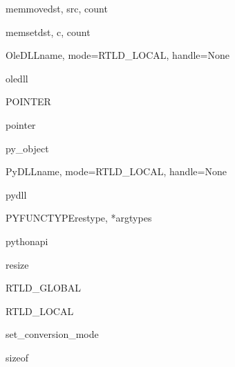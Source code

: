 \begin{funcdesc}{memmove}{dst, src, count}
\end{funcdesc}

\begin{funcdesc}{memset}{dst, c, count}
\end{funcdesc}

\begin{classdesc}{OleDLL}{name, mode=RTLD_LOCAL, handle=None}
\end{classdesc}

\begin{datadesc}{oledll}
\end{datadesc}

\begin{funcdesc}{POINTER}{}
\end{funcdesc}

\begin{funcdesc}{pointer}{}
\end{funcdesc}

\begin{classdesc}{py_object}{}
\end{classdesc}

\begin{classdesc}{PyDLL}{name, mode=RTLD_LOCAL, handle=None}
\end{classdesc}

\begin{datadesc}{pydll}{}
\end{datadesc}

\begin{funcdesc}{PYFUNCTYPE}{restype, *argtypes}
\end{funcdesc}

\begin{funcdesc}{pythonapi}{}
\end{funcdesc}

\begin{funcdesc}{resize}{}
\end{funcdesc}

\begin{datadesc}{RTLD_GLOBAL}
\end{datadesc}

\begin{datadesc}{RTLD_LOCAL}
\end{datadesc}

\begin{funcdesc}{set_conversion_mode}{}
\end{funcdesc}

\begin{funcdesc}{sizeof}{}
\end{funcdesc}

